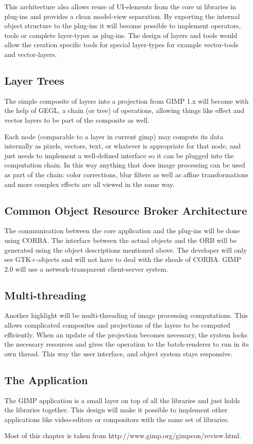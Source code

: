 This architecture also allows reuse of UI-elements from the core ui libraries
in plug-ins and provides a clean model-view separation. By exporting the
internal object structure to the plug-ins it will become possible to implement
operators, tools or complete layer-types as plug-ins. The design of layers and
tools would allow the creation specific tools for special layer-types for
example vector-tools and vector-layers.

\subsection{Layer Trees}
 
The simple composite of layers into a projection from GIMP 1.x will become with
the help of GEGL, a chain (or tree) of operations, allowing things like effect
and vector layers to be part of the composite as well. 

Each node (comparable to a layer in current gimp) may compute its data
internally as pixels, vectors, text, or whatever is appropriate for that node,
and  just needs to implement a well-defined interface so it can be plugged into
the computation chain. In this way anything that does image processing
can be used as part of the chain: color corrections, blur filters as well as
affine transformations and more complex effects are all viewed in 
the same way.

\subsection{Common Object Resource Broker Architecture}

The communication between the core application and the plug-ins will be done
using CORBA. The interface between the actual objects and the ORB will be
generated using the object descriptions mentioned above. The developer will
only see GTK+-objects and will not have to deal with the shoals of CORBA.  GIMP
2.0 will use a network-transparent client-server system.

\subsection{Multi-threading}

Another highlight will be multi-threading of image processing computations.
This allows complicated composites and projections of the layers to be computed
efficiently. When an update of the projection becomes necessary, the system
locks the necessary resources and gives the operation to the batch-renderer to
run in its own thread. This way the user interface, and object system stays
responsive.

\subsection{The Application}
The GIMP application is a small layer on top of all the libraries and just
holds the libraries together.  This design will make it possible to implement
other applications like video-editors or compositors with the same set of
libraries.

Most of this chapter is taken from http://www.gimp.org/gimpcon/review.html.
 
